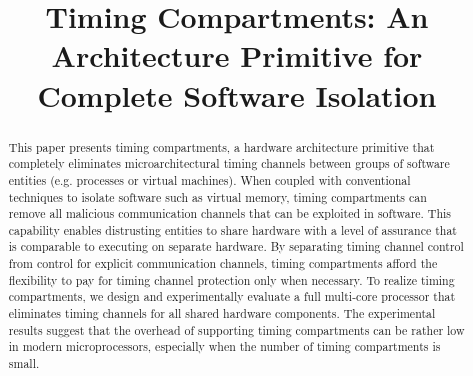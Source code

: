 \title{
\vspace{-0.1in}
    Timing Compartments: An Architecture Primitive for Complete Software 
    Isolation
}



\date{}
\maketitle

\thispagestyle{empty}

\begin{abstract}
    This paper presents timing compartments, a hardware architecture primitive 
    that completely eliminates microarchitectural timing channels between 
    groups of software entities (e.g. processes or virtual machines). 
    When coupled with conventional techniques to isolate software such as
    virtual memory, timing compartments can remove all malicious 
    communication channels
    that can be exploited in software.
    This capability enables distrusting entities to share hardware with
    a level of assurance that is comparable to executing on 
    separate hardware.
    By separating timing channel control from control for explicit communication
    channels, timing compartments afford the flexibility to pay for timing 
    channel protection only when necessary. To realize timing compartments, we 
    design and experimentally evaluate a full multi-core processor that eliminates 
    timing channels for all shared hardware components.
    The experimental results suggest that the overhead of supporting 
    timing compartments can be rather low in modern microprocessors, especially when
    the number of timing compartments is small.

\end{abstract}
